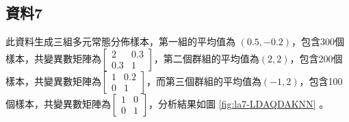 \documentclass[12pt, a4paper]{article}
\begin{document}
\subsection{資料7}
此資料生成三組多元常態分佈樣本，第一組的平均值為 $(0.5, -0.2)$，包含300個樣本，共變異數矩陣為$\begin{bmatrix}2 & 0.3 \\0.3 & 1 \end{bmatrix}$，第二個群組的平均值為$(2, 2)$，包含200個樣本，共變異數矩陣為$\begin{bmatrix}1 & 0.2 \\0 & 1 \end{bmatrix}$，而第三個群組的平均值為$(-1, 2)$，包含100個樣本，共變異數矩陣為$\begin{bmatrix}1 & 0 \\0 & 1 \end{bmatrix}$，分析結果如圖 \ref{fig:la7-LDAQDAKNN} 。
\end{document}

